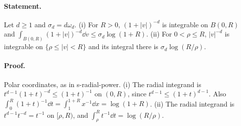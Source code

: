 \paragraph{Statement.} Let $d\geq1$ and $\sigma_d=d\omega_d$. (i) For $R>0$, $(1+|v|)^{-d}$ is integrable on
$B(0,R)$ and $\int_{B(0,R)}(1+|v|)^{-d}\dd v\leq\sigma_d\log(1+R)$. (ii) For $0<\rho\leq R$,
$|v|^{-d}$ is integrable on $\{\rho\leq|v|<R\}$ and its integral there is $\sigma_d\log(R/\rho)$.
\paragraph{Proof.} Polar coordinates, as in s-radial-power. (i) The radial integrand is
$t^{d-1}(1+t)^{-d}\leq(1+t)^{-1}$ on $(0,R)$, since $t^{d-1}\leq(1+t)^{d-1}$. Also
$\int_0^R(1+t)^{-1}\dd t=\int_1^{1+R}x^{-1}\dd x=\log(1+R)$. (ii) The radial integrand is
$t^{d-1}t^{-d}=t^{-1}$ on $[\rho,R)$, and $\int_\rho^Rt^{-1}\dd t=\log(R/\rho)$.

